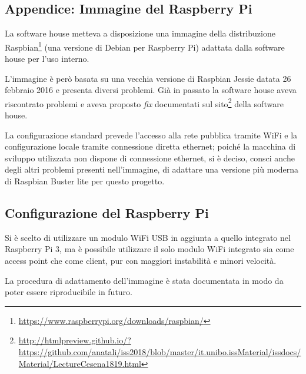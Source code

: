 
\begin{appendix}
  \section{Appendice: Immagine del Raspberry Pi}\label{app:raspi}

  La software house metteva a disposizione una immagine della distribuzione Raspbian\footnote{\url{https://www.raspberrypi.org/downloads/raspbian/}}
  (una versione di Debian per Raspberry Pi) adattata dalla software house per l'uso interno.

  L'immagine è però basata su una vecchia versione di Raspbian Jessie datata 26 febbraio 2016 e presenta diversi problemi.
  Già in passato la software house aveva riscontrato problemi e aveva proposto \textit{fix}
  documentati sul sito\footnote{\url{http://htmlpreview.github.io/?https://github.com/anatali/iss2018/blob/master/it.unibo.issMaterial/issdocs/Material/LectureCesena1819.html}}
  della software house.

  La configurazione standard prevede l'accesso alla rete pubblica tramite WiFi e la configurazione locale tramite connessione diretta ethernet;
  poiché la macchina di sviluppo utilizzata non dispone di connessione ethernet, si è deciso,
  consci anche degli altri problemi presenti nell'immagine, di adattare una versione più moderna di Raspbian Buster lite per questo progetto.

  \subsection{Configurazione del Raspberry Pi}\label{app:raspi:conf}

  Si è scelto di utilizzare un modulo WiFi USB in aggiunta a quello integrato nel Raspberry Pi 3,
  ma è possibile utilizzare il solo modulo WiFi integrato sia come access point che come client, pur con maggiori instabilità e minori velocità.

  La procedura di adattamento dell'immagine è stata documentata in modo da poter essere riproducibile in futuro.


\end{appendix}
